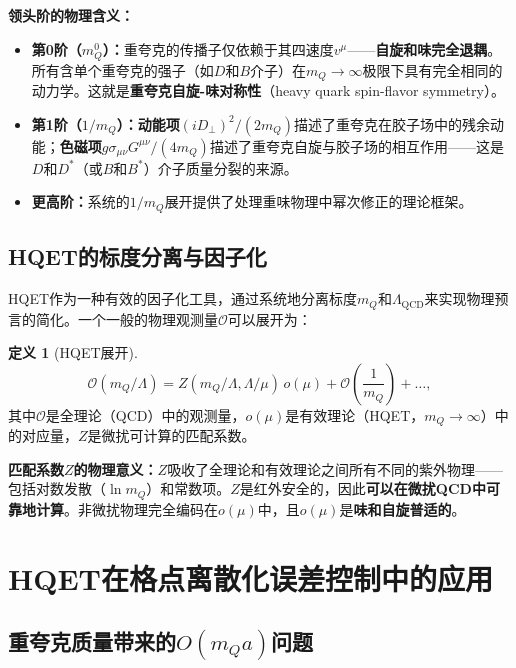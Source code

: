 \documentclass[12pt,a4paper]{ctexart}
\theoremstyle{definition}
\newtheorem{definition}{定义}[section]
\begin{document}
\textbf{领头阶的物理含义：}
\begin{itemize}
    \item \textbf{第0阶（$m_Q^0$）：}重夸克的传播子仅依赖于其四速度$v^\mu$——\textbf{自旋和味完全退耦}。所有含单个重夸克的强子（如$D$和$B$介子）在$m_Q \to \infty$极限下具有完全相同的动力学。这就是\textbf{重夸克自旋-味对称性}（heavy quark spin-flavor symmetry）。

    \item \textbf{第1阶（$1/m_Q$）：}\textbf{动能项}$(iD_\perp)^2/(2m_Q)$描述了重夸克在胶子场中的残余动能；\textbf{色磁项}$g\sigma_{\mu\nu}G^{\mu\nu}/(4m_Q)$描述了重夸克自旋与胶子场的相互作用——这是$D$和$D^*$（或$B$和$B^*$）介子质量分裂的来源。

    \item \textbf{更高阶：}系统的$1/m_Q$展开提供了处理重味物理中幂次修正的理论框架。
\end{itemize}

\subsection{HQET的标度分离与因子化}

HQET作为一种有效的因子化工具，通过系统地分离标度$m_Q$和$\Lambda_{\text{QCD}}$来实现物理预言的简化。一个一般的物理观测量$\mathcal{O}$可以展开为\cite{Ji2014LaMET}：

\begin{definition}[HQET展开]\cite{Ji2014LaMET}
\begin{equation}
\boxed{\mathcal{O}(m_Q/\Lambda) = Z(m_Q/\Lambda, \Lambda/\mu) \, o(\mu) + \mathcal{O}\left(\frac{1}{m_Q}\right) + \ldots},
\label{eq:HQET_expansion}
\end{equation}
其中$\mathcal{O}$是全理论（QCD）中的观测量，$o(\mu)$是有效理论（HQET，$m_Q \to \infty$）中的对应量，$Z$是微扰可计算的匹配系数。
\end{definition}

\textbf{匹配系数$Z$的物理意义：}$Z$吸收了全理论和有效理论之间所有不同的紫外物理——包括对数发散（$\ln m_Q$）和常数项。$Z$是红外安全的，因此\textbf{可以在微扰QCD中可靠地计算}。非微扰物理完全编码在$o(\mu)$中，且$o(\mu)$是\textbf{味和自旋普适的}。

\section{HQET在格点离散化误差控制中的应用}

\subsection{重夸克质量带来的$O(m_Q a)$问题}
\end{document}
